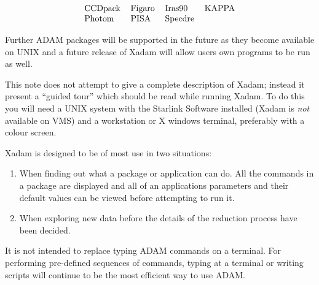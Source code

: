 \setlength{\tabcolsep}{0.3in}
\[\begin{tabular}{llll}
CCDpack &Figaro &Iras90 &KAPPA \\
Photom &PISA &Specdre
\end{tabular}\]

Further ADAM packages will be supported in the future as they become available
on UNIX and a future release of Xadam will allow users own programs to be
run as well.

This note does not attempt to give a complete description of Xadam; instead
it present a ``guided tour'' which should be read while running Xadam. To do
this you will need a UNIX system with the Starlink Software installed (Xadam 
is {\em not} available on VMS) and a workstation or X windows terminal,
preferably with a colour screen.

Xadam is designed to be of most use in two situations:

\begin{enumerate}

\item When finding out what a package or application can do. All the commands
in a package are displayed and all of an applications parameters and their
default values can be viewed before attempting to run it.

\item When exploring new data before the details of the reduction process
have been decided.

\end{enumerate}

It is not intended to replace typing ADAM commands on a terminal. For 
performing pre-defined sequences of commands, typing at a terminal or writing
scripts will continue to be the most efficient way to use ADAM.

\newpage

